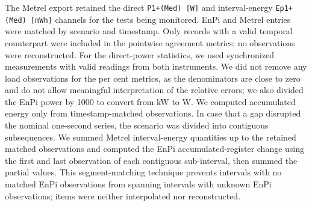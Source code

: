 \documentclass[technologies,article,submit,pdftex,moreauthors]{Definitions/mdpi}
\begin{document}
The Metrel export retained the direct \texttt{P1+(Med) [W]} and interval-energy \texttt{Ep1+(Med) [mWh]} channels for the tests being monitored. EnPi and Metrel entries were matched by scenario and timestamp. Only records with a valid temporal counterpart were included in the pointwise agreement metrics; no observations were reconstructed. For the direct-power statistics, we used synchronized measurements with valid readings from both instruments. We did not remove any load observations for the per cent metrics, as the denominators are close to zero and do not allow meaningful interpretation of the relative errors; we also divided the EnPi power by 1000 to convert from kW to W. We computed accumulated energy only from timestamp-matched observations. In case that a gap disrupted the nominal one-second series, the scenario was divided into contiguous subsequences. We summed Metrel interval-energy quantities up to the retained matched observations and computed the EnPi accumulated-register change using the first and last observation of each contiguous sub-interval, then summed the partial values. 
This segment-matching technique prevents intervals with no matched EnPi observations from spanning intervals with unknown EnPi observations; items were neither interpolated nor reconstructed. 
\end{document}
